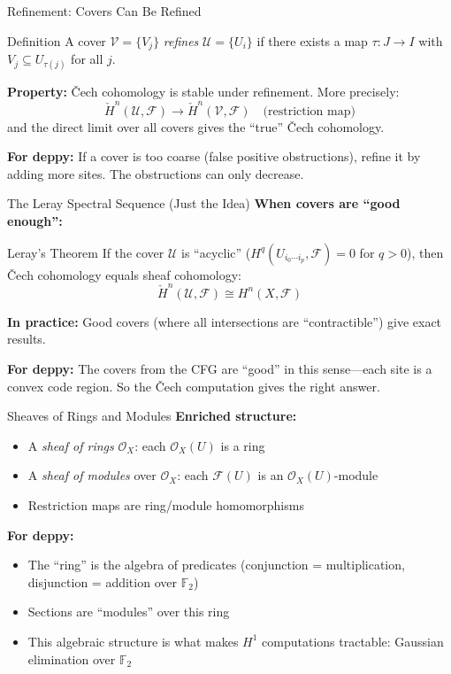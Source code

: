 \documentclass[aspectratio=169,10pt]{beamer}
\newcommand{\Fscr}{\mathcal{F}}
\newcommand{\Oscr}{\mathcal{O}}
\newcommand{\Uscr}{\mathcal{U}}
\begin{document}
\begin{frame}{Refinement: Covers Can Be Refined}
\begin{block}{Definition}
A cover $\mathcal{V} = \{V_j\}$ \emph{refines} $\Uscr = \{U_i\}$ if there exists a map $\tau : J \to I$ with $V_j \subseteq U_{\tau(j)}$ for all $j$.
\end{block}

\textbf{Property:} \v{C}ech cohomology is stable under refinement. More precisely:
\[
\check{H}^n(\Uscr, \Fscr) \to \check{H}^n(\mathcal{V}, \Fscr) \quad\text{(restriction map)}
\]
and the direct limit over all covers gives the ``true'' \v{C}ech cohomology.

\vspace{0.3em}
\textbf{For deppy:} If a cover is too coarse (false positive obstructions), refine it by adding more sites. The obstructions can only decrease.
\end{frame}

\begin{frame}{The Leray Spectral Sequence (Just the Idea)}
\textbf{When covers are ``good enough'':}

\begin{block}{Leray's Theorem}
If the cover $\Uscr$ is ``acyclic'' ($H^q(U_{i_0 \cdots i_p}, \Fscr) = 0$ for $q > 0$), then \v{C}ech cohomology equals sheaf cohomology:
\[
\check{H}^n(\Uscr, \Fscr) \cong H^n(X, \Fscr)
\]
\end{block}

\textbf{In practice:} Good covers (where all intersections are ``contractible'') give exact results.

\textbf{For deppy:} The covers from the CFG are ``good'' in this sense---each site is a convex code region. So the \v{C}ech computation gives the right answer.
\end{frame}

\begin{frame}{Sheaves of Rings and Modules}
\textbf{Enriched structure:}
\begin{itemize}
  \item A \emph{sheaf of rings} $\Oscr_X$: each $\Oscr_X(U)$ is a ring
  \item A \emph{sheaf of modules} over $\Oscr_X$: each $\Fscr(U)$ is an $\Oscr_X(U)$-module
  \item Restriction maps are ring/module homomorphisms
\end{itemize}

\vspace{0.3em}
\textbf{For deppy:}
\begin{itemize}
  \item The ``ring'' is the algebra of predicates (conjunction = multiplication, disjunction = addition over $\mathbb{F}_2$)
  \item Sections are ``modules'' over this ring
  \item This algebraic structure is what makes $H^1$ computations tractable: Gaussian elimination over $\mathbb{F}_2$
\end{itemize}
\end{frame}
\end{document}
